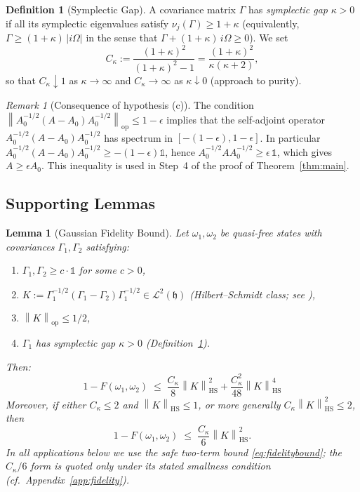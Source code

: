 \documentclass[11pt,a4paper]{article}
\newcommand{\idm}{\mathds{1}}}{\newcommand{\idm}{\mathbf{1}}}
\theoremstyle{plain}
\newtheorem{lemma}[theorem]{Lemma}
\theoremstyle{definition}
\newtheorem{definition}[theorem]{Definition}
\theoremstyle{remark}
\newtheorem{remark}[theorem]{Remark}
\newcommand{\hh}{\mathfrak{h}}
\newcommand{\opnorm}[1]{\left\lVert #1 \right\rVert_{\mathrm{op}}}
\newcommand{\hsnorm}[1]{\left\lVert #1 \right\rVert_{\mathrm{HS}}}
\newcommand{\Ckappa}{C_{\kappa}}
\begin{document}
\begin{definition}[Symplectic Gap]\label{def:sympgap}
A covariance matrix $\Gamma$ has \emph{symplectic gap} $\kappa > 0$ if all its
symplectic eigenvalues satisfy $\nu_j(\Gamma) \ge 1 + \kappa$ (equivalently,
$\Gamma \ge (1+\kappa)\,|i\Omega|$ in the sense that
$\Gamma + (1+\kappa)\, i\Omega \ge 0$). We set
\begin{equation}
\Ckappa := \frac{(1+\kappa)^2}{(1+\kappa)^2 - 1} = \frac{(1+\kappa)^2}{\kappa(\kappa+2)},
\end{equation}
so that $\Ckappa \downarrow 1$ as $\kappa \to \infty$ and $\Ckappa \to \infty$ as
$\kappa \downarrow 0$ (approach to purity).
\end{definition}

\begin{remark}[Consequence of hypothesis (c)]\label{rem:hypc}
The condition $\opnorm{A_0^{-1/2}(A - A_0)A_0^{-1/2}} \le 1 - \epsilon$ implies that
the self-adjoint operator $A_0^{-1/2}(A - A_0)A_0^{-1/2}$ has spectrum in
$[-(1-\epsilon), 1-\epsilon]$. In particular
$A_0^{-1/2}(A - A_0)A_0^{-1/2} \ge -(1-\epsilon)\idm$, hence
$A_0^{-1/2} A A_0^{-1/2} \ge \epsilon\, \idm$, which gives
$A \ge \epsilon A_0$. This inequality is used in Step~4 of the proof of
Theorem~\ref{thm:main}.
\end{remark}

\subsection{Supporting Lemmas}

\begin{lemma}[Gaussian Fidelity Bound]\label{lem:fidelity}
Let $\omega_1, \omega_2$ be quasi-free states with covariances $\Gamma_1, \Gamma_2$
satisfying:
\begin{enumerate}
\item[(i)] $\Gamma_1, \Gamma_2 \ge c \cdot \idm$ for some $c > 0$,
\item[(ii)] $K := \Gamma_1^{-1/2}(\Gamma_1 - \Gamma_2)\Gamma_1^{-1/2}
\in \mathcal{L}^2(\hh)$ (Hilbert--Schmidt class; see
\cite[Chapter~2]{Simon05}),
\item[(iii)] $\opnorm{K} \le 1/2$,
\item[(iv)] $\Gamma_1$ has symplectic gap $\kappa > 0$
(Definition~\ref{def:sympgap}).
\end{enumerate}
Then:
\begin{equation}\label{eq:fidelitybound}
1 - F(\omega_1, \omega_2) \;\le\; \frac{\Ckappa}{8} \hsnorm{K}^2
+ \frac{\Ckappa^2}{48} \hsnorm{K}^4
\end{equation}
Moreover, if either $\Ckappa \le 2$ and $\hsnorm{K} \le 1$, or more generally
$\Ckappa\hsnorm{K}^2 \le 2$, then
\begin{equation}
1 - F(\omega_1, \omega_2) \;\le\; \frac{\Ckappa}{6} \hsnorm{K}^2.
\end{equation}
In all applications below we use the safe two-term bound
\eqref{eq:fidelitybound}; the $\Ckappa/6$ form is quoted only under its
stated smallness condition (cf.\ Appendix~\ref{app:fidelity}).
\end{lemma}
\end{document}
